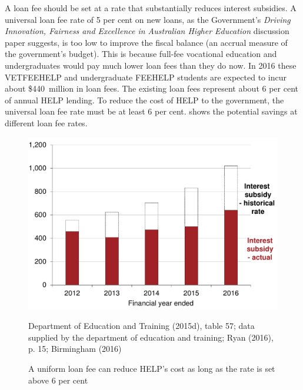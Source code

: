 \documentclass[embargoed]{grattan}
\begin{document}
A loan fee should be set at a rate that substantially reduces interest subsidies.
A universal loan fee rate of 5 per cent on new loans, as the Government's \emph{Driving Innovation, Fairness and Excellence in Australian Higher Education} discussion paper suggests, is too low to improve the fiscal balance (an accrual measure of the government's budget).
This is because full-fee vocational education and undergraduates would pay much lower loan fees than they do now.
In 2016 these \gls{VETFEEHELP} and undergraduate \gls{FEEHELP} students are expected to incur about \$440~million in loan fees.
The existing loan fees represent about 6 per cent of annual \gls{HELP} lending.
To reduce the cost of \gls{HELP} to the government, the universal loan fee rate must be at least 6 per cent.
 shows the potential savings at different loan fee rates.

\begin{figure}
\caption[A uniform loan fee can reduce {HELP}'s cost as long as the rate is set above 6 per cent]{A uniform loan fee can reduce \gls{HELP}'s cost as long as the rate is set above 6 per cent}\label{fig:fig20-uniform-loan-fee-can-reduce-HELPs-cost-as-long-as-the-rate-is-set-above-6pc}

\includegraphics[page=20]{atlas/Chartpack.pdf}

%
{Department of Education and Training (2015d), table 57; data supplied by the department of education and training; Ryan (2016), p. 15; Birmingham (2016)}
\end{figure}
\end{document}
